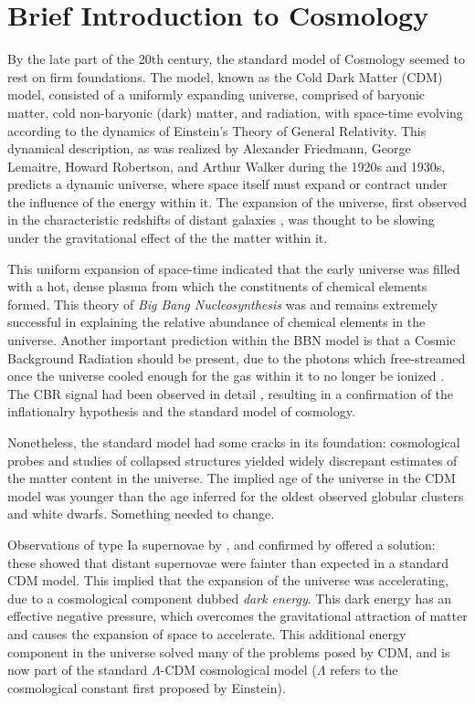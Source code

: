 \chapter{Brief Introduction to Cosmology}

By the late part of the 20th century, the standard model of Cosmology
seemed to rest on firm foundations.  The model, known as the Cold Dark Matter
(CDM) model, consisted of a uniformly
expanding universe, comprised of baryonic matter, cold
non-baryonic (dark) matter, and radiation, with space-time evolving
according to the dynamics of Einstein's Theory of General Relativity.
This dynamical description, as was realized by Alexander Friedmann,
George Lemaitre, Howard Robertson, and Arthur Walker during the
1920s and 1930s,
predicts a dynamic universe, where space itself must expand or contract
under the influence of the energy within it.  The expansion of the universe,
first observed in the characteristic redshifts of distant galaxies
\citep{hubble1929}, was thought to be slowing under the
gravitational effect of the the matter within it.

This uniform expansion of space-time indicated that the early universe
was filled with a hot, dense plasma from which the constituents of
chemical elements
formed.  This theory of {\it Big Bang Nucleosynthesis} \citep[BBN:][]{Alpher48}
was and remains extremely successful in explaining the relative
abundance of chemical elements in the universe.  Another important prediction
within the BBN model is that a Cosmic Background Radiation should be present,
due to the photons which free-streamed once the universe cooled enough for
the gas within it to no longer be ionized \citep{Alpher48b}.
The CBR signal had been observed in detail \citep{Smoot92},
resulting in a confirmation of the inflationalry
hypothesis and the standard model of cosmology.

Nonetheless, the standard model had some cracks in its foundation:
cosmological probes and
studies of collapsed structures yielded widely discrepant estimates of the
matter content in the universe.  The implied age of the universe in the CDM
model was younger than the age inferred for the oldest observed globular
clusters and white dwarfs.  Something needed to change.

Observations of type Ia supernovae by \citet{Riess98}, and confirmed by
\citet{Perlmutter99} offered a solution: these showed that distant supernovae
were fainter than expected in a standard CDM model.  This implied that the
expansion of the universe was accelerating, due to a cosmological component
dubbed {\it dark energy}.  This dark energy has an effective negative pressure,
which overcomes the gravitational attraction of matter and causes the
expansion of space to accelerate.  This additional energy component in the
universe solved many of the problems posed by CDM, and is now part of the
standard $\Lambda$-CDM cosmological model ($\Lambda$ refers to the cosmological
constant first proposed by Einstein).

